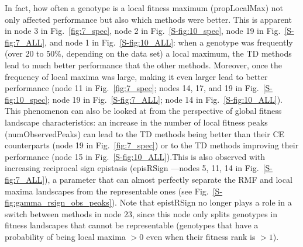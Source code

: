 \documentclass[a4paper,10pt]{article}
\begin{document}
In fact, how often a genotype is a local fitness maximum (propLocalMax) not only
affected performance but also which methods were better. This is apparent in
node 3 in Fig.~\ref{fig:7_spec}, node 2 in Fig.~\ref{S-fig:10_spec}, node 19 in
Fig.~\ref{S-fig:7_ALL}, and node 1 in Fig.~\ref{S-fig:10_ALL}: when a genotype
was frequently (over 20 to 50\%, depending on the data set) a local maximum, the
TD methods lead to much better performance that the other methods. Moreover,
once the frequency of local maxima was large, making it even larger lead to
better performance (node 11 in Fig.~\ref{fig:7_spec}; nodes 14, 17, and 19 in
Fig.~\ref{S-fig:10_spec}; node 19 in Fig.~\ref{S-fig:7_ALL}; node 14 in
Fig.~\ref{S-fig:10_ALL}). This phenomenon can also be looked at from the
perspective of global fitness landscape characteristics: an increase in the
number of local fitness peaks (numObservedPeaks) can lead to the TD methods
being better than their CE counterparts (node 19 in Fig.~\ref{fig:7_spec}) or to
the TD methods improving their performance (node 15 in
Fig.~\ref{S-fig:10_ALL}).This is also observed with increasing reciprocal sign
epistasis (episRSign ---nodes 5, 11, 14 in Fig.~\ref{S-fig:7_ALL}), a parameter
that can almost perfectly separate the RMF and local maxima landscapes from the
representable ones (see Fig.~\ref{S-fig:gamma_rsign_obs_peaks}). Note that
epistRSign no longer plays a role in a switch between methods in node 23, since
this node only splits genotypes in fitness landscapes that cannot be
representable (genotypes that have a probability of being local maxima $> 0$
even when their fitness rank is $> 1$).
\end{document}
